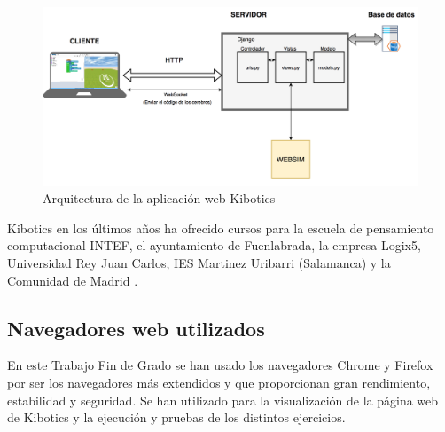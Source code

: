 \begin{figure}[H]
    \centering
    \includegraphics[width=1\textwidth, height=0.5\textwidth]{chapters/images/kibotics_arq.png}
    \caption{Arquitectura de la aplicación web Kibotics}
    \label{fig:my_label}
\end{figure}

Kibotics en los últimos años ha ofrecido cursos para la escuela de pensamiento computacional INTEF, el ayuntamiento de Fuenlabrada, la empresa Logix5, Universidad Rey Juan Carlos, IES Martinez Uribarri (Salamanca) y la Comunidad de Madrid \cite{kiboticspdf}.


\subsection{Navegadores web utilizados}

En este Trabajo Fin de Grado se han usado los navegadores Chrome y Firefox por ser los navegadores más extendidos y que proporcionan gran rendimiento, estabilidad y seguridad. Se han utilizado para la visualización de la página web de Kibotics y la ejecución y pruebas de los distintos ejercicios. 
